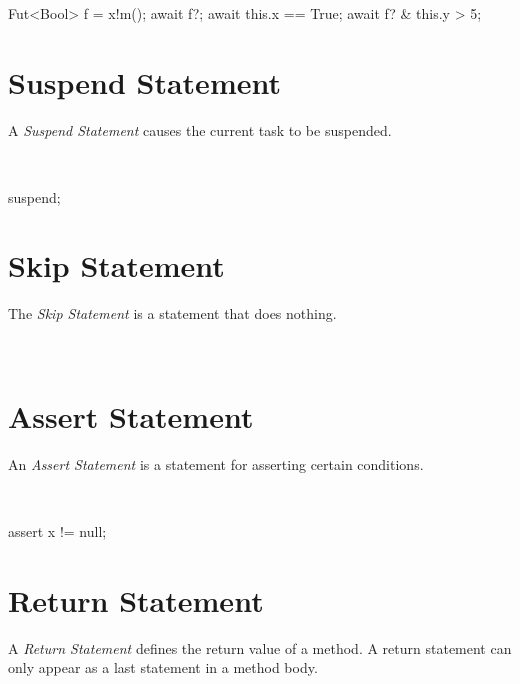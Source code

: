 \begin{abssyntax}
   {}\ \ \TRS{;}\\
       {}
               {}
               {}\ \TRS{\&}\ \\
  {}\ 
               {}\ 
\end{abssyntax}

\begin{absexample}
Fut<Bool> f = x!m();
await f?;
await this.x == True;
await f? & this.y > 5;
\end{absexample}

\section{Suspend Statement}
A \emph{Suspend Statement} causes the current task to be suspended.

\begin{abssyntax}
  {}\ \TRS{;}
\end{abssyntax}

\begin{absexample}
suspend;
\end{absexample}

\section{Skip Statement}
The \emph{Skip Statement} is a statement that does nothing.

\begin{abssyntax}
  {}\ \TRS{;}
\end{abssyntax}

\section{Assert Statement}\label{sec:abs:assert}
An \emph{Assert Statement} is a statement for asserting certain conditions.

\begin{abssyntax}
  {}\ \ \TRS{;}
\end{abssyntax}

\begin{absexample}
assert x != null;
\end{absexample}

\section{Return Statement}
A \emph{Return Statement} defines the return value of a method.
A return statement can only appear as a last statement in a method body.

